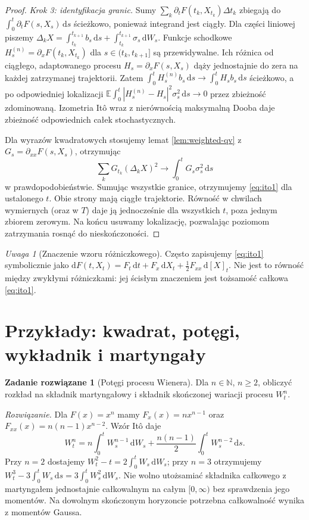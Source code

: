 \documentclass[11pt,a4paper,oneside]{report}
\numberwithin{equation}{chapter}
\theoremstyle{plain}
\theoremstyle{definition}
\newtheorem{zadanie}{Zadanie rozwiązane}[chapter]
\theoremstyle{remark}
\newtheorem{uwaga}{Uwaga}[chapter]
\newcommand{\N}{\mathbb{N}}
\newcommand{\E}{\mathbb{E}}
\newcommand{\dd}{\mathrm{d}}
\begin{document}
\begin{proof}
\emph{Krok 3: identyfikacja granic.} Sumy
$\sum_k\partial_tF(t_k,X_{t_k})\Delta t_k$
zbiegają do $\int_0^t\partial_tF(s,X_s)\,\dd s$
ścieżkowo, ponieważ integrand jest ciągły.
Dla części liniowej piszemy
$\Delta_kX=\int_{t_k}^{t_{k+1}}b_s\,\dd s
+\int_{t_k}^{t_{k+1}}\sigma_s\,\dd W_s$.
Funkcje schodkowe
$H_s^{(n)}=\partial_xF(t_k,X_{t_k})$ dla
$s\in(t_k,t_{k+1}]$ są przewidywalne. Ich różnica
od ciągłego, adaptowanego procesu
$H_s=\partial_xF(s,X_s)$ dąży jednostajnie do zera
na każdej zatrzymanej trajektorii. Zatem
$\int_0^t H_s^{(n)}b_s\,\dd s\to\int_0^t H_sb_s\,\dd s$
ścieżkowo, a po odpowiedniej lokalizacji
$\E\int_0^t|H_s^{(n)}-H_s|^2\sigma_s^2\,\dd s\to0$ przez
zbieżność zdominowaną. Izometria Itô wraz z
nierównością maksymalną Dooba daje zbieżność
odpowiednich całek stochastycznych.

Dla wyrazów kwadratowych stosujemy lemat
\ref{lem:weighted-qv} z
$G_s=\partial_{xx}F(s,X_s)$, otrzymując
\[
\sum_kG_{t_k}(\Delta_kX)^2
\longrightarrow\int_0^tG_s\sigma_s^2\,\dd s
\]
w prawdopodobieństwie. Sumując wszystkie granice,
otrzymujemy \eqref{eq:ito1} dla ustalonego $t$.
Obie strony mają ciągłe trajektorie. Równość w chwilach
wymiernych (oraz w $T$) daje ją jednocześnie dla wszystkich
$t$, poza jednym zbiorem zerowym. Na końcu usuwamy
lokalizację, pozwalając poziomom zatrzymania rosnąć do nieskończoności.
\end{proof}

\begin{uwaga}[Znaczenie wzoru różniczkowego]
Często zapisujemy \eqref{eq:ito1} symbolicznie jako
$\dd F(t,X_t)=F_t\,\dd t+F_x\,\dd X_t
+\frac12F_{xx}\,\dd[X]_t$. Nie jest to równość
między zwykłymi różniczkami: jej ścisłym znaczeniem
jest tożsamość całkowa \eqref{eq:ito1}.
\end{uwaga}

\section{Przykłady: kwadrat, potęgi, wykładnik i martyngały}\label{sec:volIII:03:04}
\begin{zadanie}[Potęgi procesu Wienera]
Dla $n\in\N$, $n\ge2$, obliczyć rozkład na składnik
martyngałowy i składnik skończonej wariacji procesu $W_t^n$.

\emph{Rozwiązanie.} Dla $F(x)=x^n$ mamy
$F_x(x)=nx^{n-1}$ oraz $F_{xx}(x)=n(n-1)x^{n-2}$.
Wzór Itô daje
\[
W_t^n=n\int_0^tW_s^{n-1}\,\dd W_s
+\frac{n(n-1)}2\int_0^tW_s^{n-2}\,\dd s.
\]
Przy $n=2$ dostajemy $W_t^2-t=2\int_0^tW_s\,\dd W_s$;
przy $n=3$ otrzymujemy $W_t^3-3\int_0^tW_s\,\dd s
=3\int_0^tW_s^2\,\dd W_s$. Nie wolno utożsamiać
składnika całkowego z martyngałem jednostajnie
całkowalnym na całym $[0,\infty)$ bez sprawdzenia
jego momentów. Na dowolnym skończonym horyzoncie
potrzebna całkowalność wynika z momentów Gaussa.
\end{zadanie}
\end{document}

